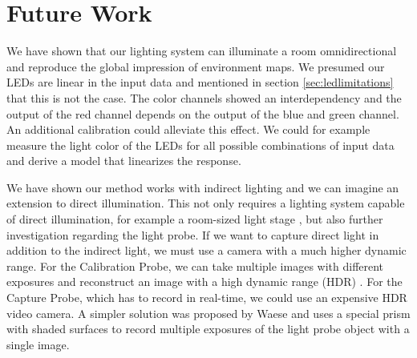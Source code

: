 \chapter{Future Work}
  We have shown that our lighting system can illuminate a room omnidirectional and reproduce the global impression of environment maps.
  We presumed our LEDs are linear in the input data and mentioned in section \ref{sec:ledlimitations} that this is not the case. 
  The color channels showed an interdependency and the output of the red channel depends on the output of the blue and green channel.
  An additional calibration could alleviate this effect. 
  We could for example measure the light color of the LEDs for all possible combinations of input data and derive a model that linearizes the response.
  
  We have shown our method works with indirect lighting and we can imagine an extension to direct illumination. 
  This not only requires a lighting system capable of direct illumination, for example a room-sized light stage \cite{debevec2002lighting}, 
  but also further investigation regarding the light probe.
  If we want to capture direct light in addition to the indirect light, we must use a camera with a much higher dynamic range.
  For the Calibration Probe, we can take multiple images  with different exposures and reconstruct an image with a high dynamic range (HDR) \cite{debevec2008recovering}.
  For the Capture Probe, which has to record in real-time, we could use an expensive HDR video camera. 
  A simpler solution was proposed by Waese \cite{waese2009real} and uses a special prism with shaded surfaces to record multiple exposures of the light probe object with a single image.
  
